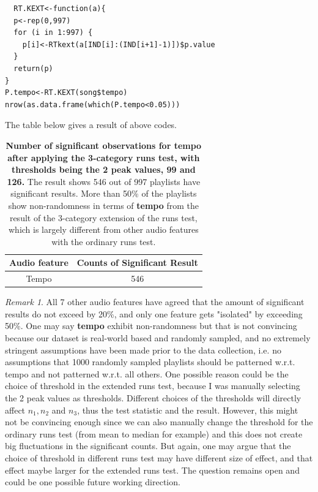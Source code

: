 \documentclass[12pt]{article}
\theoremstyle{plain}
\theoremstyle{definition}
\theoremstyle{remark}
\newtheorem*{remark}{Remark}
\begin{document}
\begin{verbatim}
  RT.KEXT<-function(a){
  p<-rep(0,997)
  for (i in 1:997) {
    p[i]<-RTkext(a[IND[i]:(IND[i+1]-1)])$p.value
  }
  return(p)
}
P.tempo<-RT.KEXT(song$tempo)
nrow(as.data.frame(which(P.tempo<0.05)))
\end{verbatim}

The table below gives a result of above codes.

\begin{table}[h!]
\begin{center}
\begin{tabular}{|c|c|}
    \hline
    Audio feature & Counts of Significant Result\\
    \hline
    Tempo & 546 \\
    \hline
\end{tabular}
\label{table 2}
\caption{\textbf{Number of significant observations for tempo after applying the 3-category runs test, with thresholds being the 2 peak values, 99 and 126.} The result shows 546 out of 997 playlists have significant results. More than 50\% of the playlists show non-randomness in terms of \textbf{tempo} from the result of the 3-category extension of the runs test, which is largely different from other audio features with the ordinary runs test.}
\end{center}
\end{table}

\begin{remark}
All 7 other audio features have agreed that the amount of significant results do not exceed by 20\%, and only one feature gets "isolated" by exceeding 50\%. One may say \textbf{tempo} exhibit non-randomness but that is not convincing because our dataset is real-world based and randomly sampled, and no extremely stringent assumptions have been made prior to the data collection, i.e. no assumptions that 1000 randomly sampled playlists should be patterned w.r.t. tempo and not patterned w.r.t. all others. One possible reason could be the choice of threshold in the extended runs test, because I was manually selecting the 2 peak values as thresholds. Different choices of the thresholds will directly affect $n_1,n_2$ and $n_3$, thus the test statistic and the result. However, this might not be convincing enough since we can also manually change the threshold for the ordinary runs test (from mean to median for example) and this does not create big fluctuations in the significant counts. But again, one may argue that the choice of threshold in different runs test may have different size of effect, and that effect maybe larger for the extended runs test. The question remains open and could be one possible future working direction.
\end{remark}
\clearpage
\end{document}
